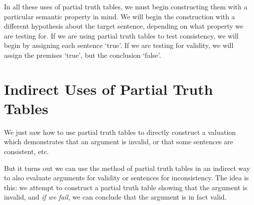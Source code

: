 In all these uses of partial truth tables, we must begin constructing them with a particular semantic property in mind. We will begin the construction with a different hypothesis about the target sentence, depending on what property we are testing for. If we are using partial truth tables to test consistency, we will begin by assigning each sentence `true'. If we are testing for validity, we will assign the premises `true', but the conclusion `false'.


\section{Indirect Uses of Partial Truth Tables}

We just saw how to use partial truth tables to directly construct a valuation which demonstrates that an argument is invalid, or that some sentences are consistent, etc.

But it turns out we can use the method of partial truth tables in an indirect way to also evaluate arguments for validity or sentences for inconsistency. The idea is this: we attempt to construct a partial truth table showing that the argument is invalid, and \emph{if we fail}, we can conclude that the argument is in fact valid.

